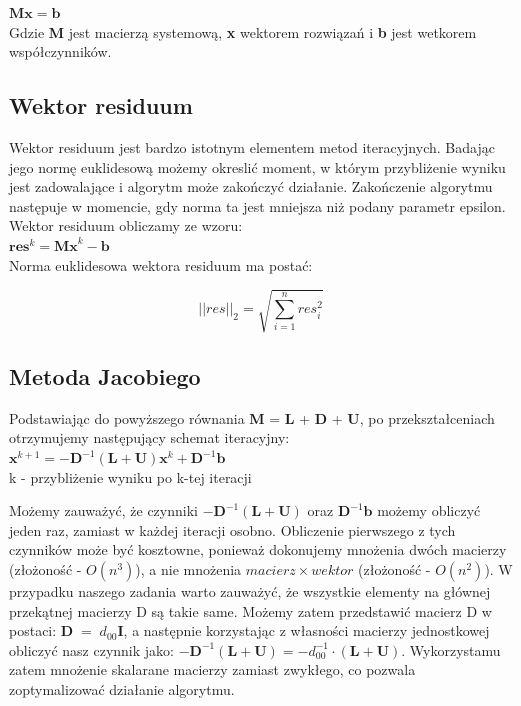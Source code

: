 \documentclass[fleqn]{article}
\begin{document}
    $\bm{M}\bm{x} = \bm{b}$ \\

    \noindent Gdzie \textbf{M} jest macierzą systemową, \textbf{x} wektorem rozwiązań i \textbf{b} jest wetkorem współczynników.

    \subsection{Wektor residuum}
    Wektor residuum jest bardzo istotnym elementem metod iteracyjnych.
    Badając jego normę euklidesową możemy okreslić moment, w którym przybliżenie wyniku jest
    zadowalające i algorytm może zakończyć działanie. Zakończenie algorytmu następuje w momencie,
    gdy norma ta jest mniejsza niż podany parametr epsilon.\\
    \noindent Wektor residuum obliczamy ze wzoru: \\

    $\bm{res}^k = \bm{Mx}^k - \bm{b}$ \\

    \noindent Norma euklidesowa wektora residuum ma postać:

        \[ 
            || res ||_2 = \sqrt{ \sum_{i = 1}^{n} res_i^2} 
       \]


    \newpage
    \subsection{Metoda Jacobiego}

    Podstawiając do powyższego równania \textbf{M} = \textbf{L} + \textbf{D} + \textbf{U}, 
    po przekształceniach otrzymujemy następujący schemat iteracyjny: \\
    
    $\bm{x}^{k+1} = -\bm{D}^{-1}(\bm{L} + \bm{U})\bm{x}^k + \bm{D}^{-1}\bm{b}$ \\

    \noindent k - przybliżenie wyniku po k-tej iteracji

    \noindent Możemy zauważyć, że czynniki $-\bm{D}^{-1}(\bm{L} + \bm{U})$ oraz $\bm{D}^{-1}\bm{b}$
    możemy obliczyć jeden raz, zamiast w każdej iteracji osobno. Obliczenie pierwszego z tych czynników może być
    kosztowne, ponieważ dokonujemy mnożenia dwóch macierzy (złożoność - $O(n^3)$), 
    a nie mnożenia $macierz \times wektor$ (złożoność - $O(n^2)$). W przypadku naszego zadania warto zauważyć,
    że wszystkie elementy na głównej przekątnej macierzy D są takie same.
    Możemy zatem przedstawić macierz D w postaci: $\bm{D} \; = \; d_{00}\bm{I}$, a następnie korzystając z własności 
    macierzy jednostkowej obliczyć nasz czynnik jako: $-\bm{D}^{-1}(\bm{L} + \bm{U}) = -d^{-1}_{00} \cdot (\bm{L} + \bm{U})$.
    Wykorzystamu zatem mnożenie skalarane macierzy zamiast zwykłego, co pozwala
    zoptymalizować działanie algorytmu. \\ 
    
\end{document}

